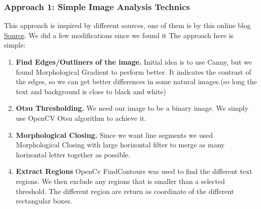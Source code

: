 \documentclass[11pt,a4paper,UKenglish]{article}
\begin{document}
\subsubsection{Approach 1: Simple Image Analysis Technics}
This approach is inspired by different sources, one of them is by this online blog \href{https://www.danvk.org/2015/01/07/finding-blocks-of-text-in-an-image-using-python-opencv-and-numpy.html}{Source}\cite{_finding_????}. We did a few modifications since we found it
The approach here is simple:
\begin{enumerate}
  \item \textbf{Find Edges/Outliners of the image.}
  Initial idea is to use Canny, but we found Morphological Gradient to perform better. It indicates the contrast of the edges, so we can get better differences in some natural images.(so long the text and background is close to black and white)
  \item \textbf{Otsu Thresholding.}
  We need our image to be a binary image. We simply use OpenCV Otsu algorithm to achieve it.
  \item \textbf{Morphological Closing.}
  Since we want line segments we used Morphological Closing with large horizontal filter to merge as many horizontal letter together as possible.
  \item \textbf{Extract Regions}
  OpenCv FindContours was used to find the different text regions. We then exclude any regions that is smaller than a selected threshold. The different region are return as coordinate of the different rectangular boxes.
\end{enumerate}
\end{document}
